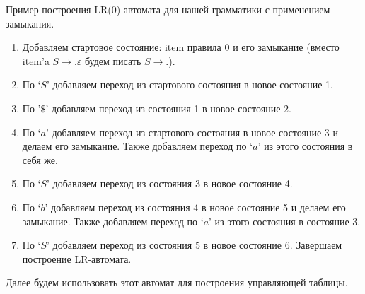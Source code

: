 \begin{example}
Пример построения LR(0)-автомата для нашей грамматики с применением замыкания.
\begin{enumerate}
\item Добавляем стартовое состояние: item правила 0 и его замыкание (вместо item'a $S \rightarrow .\varepsilon$ будем писать $S \rightarrow .$).



\item По `$S$' добавляем переход из стартового состояния в новое состояние 1.



\item По '$\$$' добавляем переход из состояния 1 в новое состояние 2.



\item По `$a$' добавляем переход из стартового состояния в новое состояние 3 и делаем его замыкание. Также добавляем переход по `$a$' из этого состояния в себя же.



\item По `$S$' добавляем переход из состояния 3 в новое состояние 4.



\item По `$b$' добавляем переход из состояния 4 в новое состояние 5 и делаем его замыкание. Также добавляем переход по `$a$' из этого состояния в состояние 3.




\item По `$S$' добавляем переход из состояния 5 в новое состояние 6. Завершаем построение LR-автомата.



\end{enumerate}
\end{example}

Далее будем использовать этот автомат для построения управляющей таблицы.

